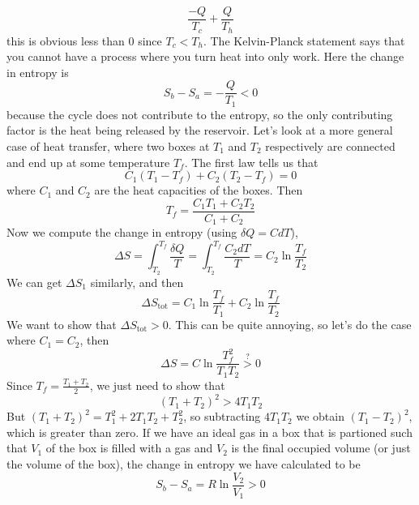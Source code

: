 \documentclass{report}
\numberwithin{equation}{section}
\begin{document}
\begin{equation*}
    \frac{-Q}{T_c} + \frac{Q}{T_h}
\end{equation*}
this is obvious less than $0$ since $T_c<T_h$. The Kelvin-Planck statement says that you cannot have a process where you turn heat into only work. Here the change in entropy is
\begin{equation*}
    S_b - S_a = -\frac{Q}{T_1} < 0 
\end{equation*}
because the cycle does not contribute to the entropy, so the only contributing factor is the heat being released by the reservoir. Let's look at a more general case of heat transfer, where two boxes at $T_1$ and $T_2$ respectively are connected and end up at some temperature $T_f$. The first law tells us that 
\begin{equation*}
    C_1(T_1-T_f) + C_2(T_2-T_f) = 0
\end{equation*}
where $C_1$ and $C_2$ are the heat capacities of the boxes. Then 
\begin{equation*}
    T_f = \frac{C_1T_1 + C_2T_2}{C_1+C_2}
\end{equation*}
Now we compute the change in entropy (using $\delta Q = C dT$), 
\begin{equation*}
    \Delta S = \int^{T_f}_{T_2}\frac{\delta Q}{T} = \int^{T_f}_{T_2}\frac{C_2 dT}{T} = C_2\ln\frac{T_f}{T_2}
\end{equation*}
We can get $\Delta S_1$ similarly, and then 
\begin{equation}
    \Delta S_{\text{tot}} =C_1\ln\frac{T_f}{T_1} + C_2\ln\frac{T_f}{T_2}
\end{equation}
We want to show that $\Delta S_{\text{tot}} >0$. This can be quite annoying, so let's do the case where $C_1 = C_2$, then 
\begin{equation*}
    \Delta S = C \ln\frac{T_f^2}{T_1T_2}\overset{\text{?}}{>}0
\end{equation*}
Since $T_f = \frac{T_1 + T_2}{2}$, we just need to show that 
\begin{equation*}
    (T_1 + T_2)^2 > 4T_1T_2
\end{equation*}
But $(T_1 + T_2)^2 = T_1^2 + 2T_1T_2 + T_2^2$, so subtracting $4T_1T_2$ we obtain $(T_1-T_2)^2$, which is greater than zero. If we have an ideal gas in a box that is partioned such that $V_1$ of the box is filled with a gas and $V_2$ is the final occupied volume (or just the volume of the box), the change in entropy we have calculated to be 
\begin{equation*}
    S_b - S_a = R\ln \frac{V_2}{V_1}>0
\end{equation*}
\end{document}
